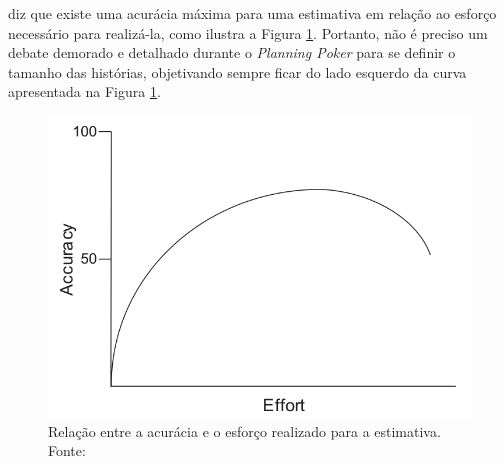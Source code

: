      diz que existe uma acurácia máxima para uma estimativa
    em relação ao esforço necessário para realizá-la, como ilustra a Figura \ref{fig:effort_accuracy}.
    Portanto, não é preciso um debate demorado e detalhado durante o \textit{Planning Poker} para se definir
    o tamanho das histórias, objetivando sempre ficar do lado esquerdo da curva apresentada na Figura \ref{fig:effort_accuracy}.
       
    
    \begin{figure}[!htb]
      \centering
      \includegraphics[scale=0.4]{figuras/effort_accuracy}
      \caption[Relação entre a acurácia e o esforço realizado para a estimativa.]
	      {Relação entre a acurácia e o esforço realizado para a estimativa. Fonte: \cite{cohn06}}
      \label{fig:effort_accuracy}
    \end{figure}
    



